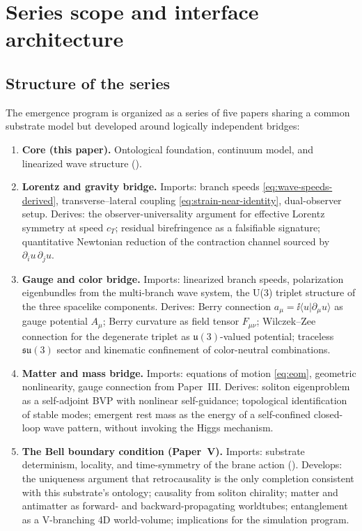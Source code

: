 \section{Series scope and interface architecture}
\label{sec:series-scope}

\subsection{Structure of the series}

The emergence program is organized as a series of five papers sharing a common substrate
model but developed around logically independent bridges:

\begin{enumerate}
  \item \textbf{Core (this paper).}
  Ontological foundation, continuum model, and linearized wave structure
  ().

  \item \textbf{Lorentz and gravity bridge.}
  Imports: branch speeds \eqref{eq:wave-speeds-derived}, transverse--lateral coupling
  \eqref{eq:strain-near-identity}, dual-observer setup.
  Derives: the observer-universality argument for effective Lorentz symmetry at speed $c_T$;
  residual birefringence as a falsifiable signature; quantitative Newtonian reduction of the
  contraction channel sourced by $\partial_i u\,\partial_j u$.

  \item \textbf{Gauge and color bridge.}
  Imports: linearized branch speeds, polarization eigenbundles from the multi-branch wave system,
  the U(3) triplet structure of the three spacelike components.
  Derives: Berry connection $a_\mu = \ii\langle u|\partial_\mu u\rangle$ as gauge potential $A_\mu$;
  Berry curvature as field tensor $F_{\mu\nu}$; Wilczek--Zee connection for the degenerate triplet
  as $\mathfrak{u}(3)$-valued potential; traceless $\mathfrak{su}(3)$ sector and kinematic confinement
  of color-neutral combinations.

  \item \textbf{Matter and mass bridge.}
  Imports: equations of motion \eqref{eq:eom}, geometric nonlinearity, gauge connection from
  Paper~III.
  Derives: soliton eigenproblem as a self-adjoint BVP with nonlinear self-guidance; topological
  identification of stable modes; emergent rest mass as the energy of a self-confined
  closed-loop wave pattern, without invoking the Higgs mechanism.

  \item \textbf{The Bell boundary condition (Paper~V).}
  Imports: substrate determinism, locality, and time-symmetry of the brane action
  ().
  Develops: the uniqueness argument that retrocausality is the only completion consistent with
  this substrate's ontology; causality from soliton chirality; matter and antimatter as
  forward- and backward-propagating worldtubes; entanglement as a V-branching 4D world-volume;
  implications for the simulation program.
\end{enumerate}


